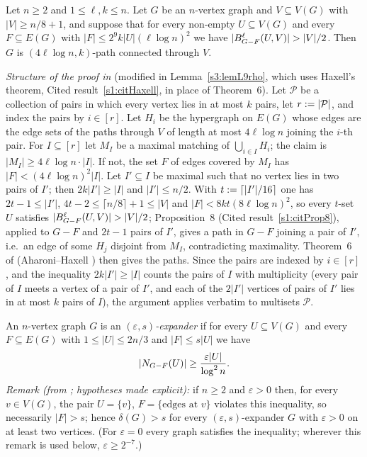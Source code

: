 \begin{citedresult}[{\cite[Lemma~9]{BM}}]\label{s1:citLem9}
Let $n\ge2$ and $1\le\ell,k\le n$. Let $G$ be an $n$-vertex graph and
$V\subseteq V(G)$ with $|V|\ge n/8+1$, and suppose that for every non-empty
$U\subseteq V(G)$ and every $F\subseteq E(G)$ with
$|F|\le2^9k|U|(\ell\log n)^2$ we have $|\Ball{\ell}{G-F}{U,V}|>|V|/2$. Then $G$
is $(4\ell\log n,k)$-path connected through $V$.

\emph{Structure of the proof in \cite{BM}} (modified in Lemma~\ref{s3:lemL9rho},
which uses Haxell's theorem, Cited result~\ref{s1:citHaxell}, in place of
Theorem~6).
Let $\mathcal P$ be a collection of pairs in which every vertex lies in at most
$k$ pairs, let $r\mathrel{:=}|\mathcal P|$, and index the pairs by $i\in[r]$. Let
$H_i$ be the hypergraph on $E(G)$ whose edges are the edge sets of the paths
through $V$ of length at most $4\ell\log n$ joining the $i$-th pair. For
$I\subseteq[r]$ let $M_I$ be a maximal matching of $\bigcup_{i\in I}H_i$; the
claim is $|M_I|\ge4\ell\log n\cdot|I|$. If not, the set $F$ of edges covered by
$M_I$ has $|F|<(4\ell\log n)^2|I|$. Let $I'\subseteq I$ be maximal such that no
vertex lies in two pairs of $I'$; then $2k|I'|\ge|I|$ and $|I'|\le n/2$. With
$t\mathrel{:=}\lceil|I'|/16\rceil$ one has $2t-1\le|I'|$, $4t-2\le\lceil n/8\rceil+1\le
|V|$ and $|F|<8kt(8\ell\log n)^2$, so every $t$-set $U$ satisfies
$|\Ball{\ell}{G-F}{U,V}|>|V|/2$; Proposition~8 (Cited
result~\ref{s1:citProp8}), applied to $G-F$ and $2t-1$ pairs of $I'$, gives a
path in $G-F$ joining a pair of $I'$, i.e.\ an edge of some $H_j$ disjoint from
$M_I$, contradicting maximality. Theorem~6 of \cite{BM} (Aharoni--Haxell
\cite{AH00}) then gives the paths. Since the pairs are indexed by $i\in[r]$, and the inequality
$2k|I'|\ge|I|$ counts the pairs of $I$ with multiplicity (every pair of $I$
meets a vertex of a pair of $I'$, and each of the $2|I'|$ vertices of pairs of
$I'$ lies in at most $k$ pairs of $I$), the argument applies verbatim to
multisets $\mathcal P$.
\end{citedresult}

\begin{citedresult}[{\cite[Definition~11]{BM}}]\label{s1:citDef11}
An $n$-vertex graph $G$ is an \emph{$(\varepsilon,s)$-expander} if for every
$U\subseteq V(G)$ and every $F\subseteq E(G)$ with $1\le|U|\le2n/3$ and
$|F|\le s|U|$ we have
\[
|N_{G-F}(U)|\ge\frac{\varepsilon|U|}{\log^2n}.
\]
\emph{Remark (from \cite{BM}; hypotheses made explicit):} if $n\ge2$ and $\varepsilon>0$ then, for every
$v\in V(G)$, the pair $U=\{v\}$, $F=\{\text{edges at }v\}$ violates this
inequality, so necessarily $|F|>s$; hence $\delta(G)>s$ for every
$(\varepsilon,s)$-expander $G$ with $\varepsilon>0$ on at least two vertices.
(For $\varepsilon=0$ every graph satisfies the inequality; wherever this remark
is used below, $\varepsilon\ge2^{-7}$.)
\end{citedresult}


